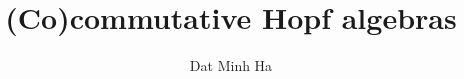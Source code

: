 

\setcounter{section}{-1}





    \title{(Co)commutative Hopf algebras}
    
    \author{Dat Minh Ha}
    \maketitle
    
    \begin{abstract}
    
    \end{abstract}
    
    {
    \hypersetup{} 
    \tableofcontents %
    }

    \listoftodos

    

    

    

    

    \begin{appendices}
        

        
    \end{appendices}
    
    \printbibliography


